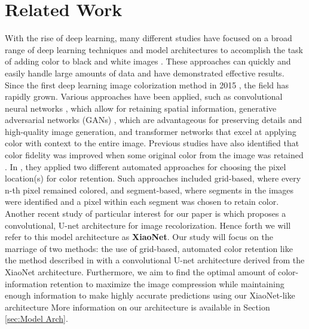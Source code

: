 \section{Related Work}
With the rise of deep learning, many different studies have focused on a broad range of deep learning techniques and model architectures to accomplish the task of adding color to black and white images \cite{Cheng2015}. These approaches can quickly and easily handle large amounts of data and have demonstrated effective results. Since the first deep learning image colorization method in 2015 \cite{Cheng2015}, the field has rapidly grown. Various approaches have been applied, such as convolutional neural networks \cite{Larsson2016, He2018, Zhang2017, Su2020, Dong2022}, which allow for retaining spatial information, generative adversarial networks (GANs) \cite{Zhang2018, Kuang2020}, which are advantageous for preserving details and high-quality image generation, and transformer networks \cite{Kumar2021} that excel at applying color with context to the entire image. Previous studies have also identified that color fidelity was improved when some original color from the image was retained \cite{FatimaAroosh2021Gitn, Boutarfass2020}. In \cite{FatimaAroosh2021Gitn}, they applied two different automated approaches for choosing the pixel location(s) for color retention. Such approaches included grid-based, where every n-th pixel remained colored, and segment-based, where segments in the images were identified and a pixel within each segment was chosen to retain color. Another recent study of particular interest for our paper is \cite{XiaoYi2022IDCa} which proposes a convolutional, U-net architecture for image recolorization. Hence forth we will refer to this model architecture as \textbf{XiaoNet}. Our study will focus on the marriage of two methods: the use of grid-based, automated color retention like the method described in \cite{FatimaAroosh2021Gitn} with a convolutional U-net architecture derived from the XiaoNet architecture. Furthermore, we aim to find the optimal amount of color-information retention to maximize the image compression while maintaining enough information to make highly accurate predictions using our XiaoNet-like architecture More information on our architecture is available in Section \ref{sec:Model Arch}.
